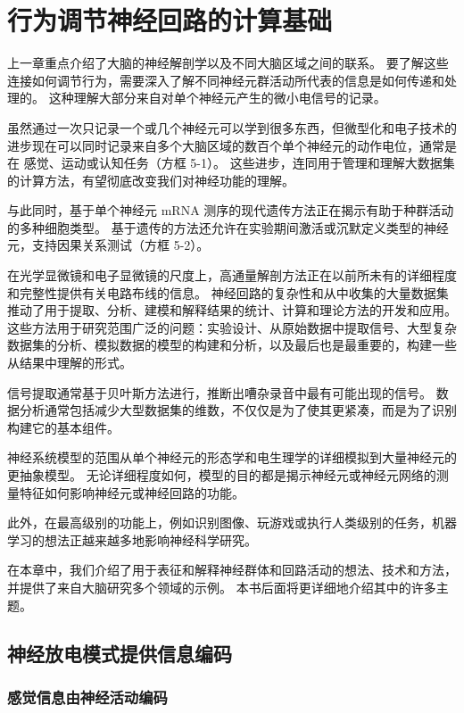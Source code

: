 \chapter{行为调节神经回路的计算基础} \label{chap:chap5}

上一章重点介绍了大脑的神经解剖学以及不同大脑区域之间的联系。
要了解这些连接如何调节行为，需要深入了解不同神经元群活动所代表的信息是如何传递和处理的。
这种理解大部分来自对单个神经元产生的微小电信号的记录。


虽然通过一次只记录一个或几个神经元可以学到很多东西，但微型化和电子技术的进步现在可以同时记录来自多个大脑区域的数百个单个神经元的动作电位，通常是在 感觉、运动或认知任务（方框 5-1）。 
这些进步，连同用于管理和理解大数据集的计算方法，有望彻底改变我们对神经功能的理解。


与此同时，基于单个神经元 mRNA 测序的现代遗传方法正在揭示有助于种群活动的多种细胞类型。
基于遗传的方法还允许在实验期间激活或沉默定义类型的神经元，支持因果关系测试（方框 5-2）。


在光学显微镜和电子显微镜的尺度上，高通量解剖方法正在以前所未有的详细程度和完整性提供有关电路布线的信息。
神经回路的复杂性和从中收集的大量数据集推动了用于提取、分析、建模和解释结果的统计、计算和理论方法的开发和应用。
这些方法用于研究范围广泛的问题：实验设计、从原始数据中提取信号、大型复杂数据集的分析、模拟数据的模型的构建和分析，以及最后也是最重要的，构建一些 从结果中理解的形式。


信号提取通常基于贝叶斯方法进行，推断出嘈杂录音中最有可能出现的信号。
数据分析通常包括减少大型数据集的维数，不仅仅是为了使其更紧凑，而是为了识别构建它的基本组件。


神经系统模型的范围从单个神经元的形态学和电生理学的详细模拟到大量神经元的更抽象模型。
无论详细程度如何，模型的目的都是揭示神经元或神经元网络的测量特征如何影响神经元或神经回路的功能。

此外，在最高级别的功能上，例如识别图像、玩游戏或执行人类级别的任务，机器学习的想法正越来越多地影响神经科学研究。


在本章中，我们介绍了用于表征和解释神经群体和回路活动的想法、技术和方法，并提供了来自大脑研究多个领域的示例。
本书后面将更详细地介绍其中的许多主题。



\section{神经放电模式提供信息编码}

\subsection{感觉信息由神经活动编码}

